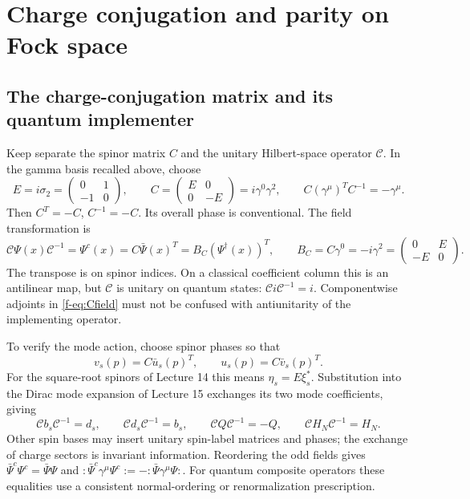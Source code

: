 \documentclass[11pt]{article}
\newcommand{\Dc}{\mathcal C}
\begin{document}
\section{Charge conjugation and parity on Fock space}
\subsection{The charge-conjugation matrix and its quantum implementer}
Keep separate the spinor matrix \(C\) and the unitary Hilbert-space
operator \(\Dc\). In the gamma basis recalled above, choose
\begin{equation}
 E=i\sigma_2=\begin{pmatrix}0&1\\-1&0\end{pmatrix},\qquad
 C=\begin{pmatrix}E&0\\0&-E\end{pmatrix}=i\gamma^0\gamma^2,
 \qquad C(\gamma^\mu)^T C^{-1}=-\gamma^\mu.
 \label{f-eq:Cmatrix}
\end{equation}
Then \(C^T=-C\), \(C^{-1}=-C\). Its overall phase is conventional.
The field transformation is
\begin{equation}
 \Dc\Psi(x)\Dc^{-1}=\Psi^c(x)=C\bar\Psi(x)^T
   =B_C(\Psi^\dagger(x))^T,\qquad B_C=C\gamma^0=-i\gamma^2=\begin{pmatrix}0&E\\-E&0\end{pmatrix}.
 \label{f-eq:Cfield}
\end{equation}
The transpose is on spinor indices. On a classical coefficient column
this is an antilinear map, but \(\Dc\) is unitary on quantum states:
\(\Dc i\Dc^{-1}=i\). Componentwise adjoints in \eqref{f-eq:Cfield} must not
be confused with antiunitarity of the implementing operator.

To verify the mode action, choose spinor phases so that
\begin{equation}
 v_s(p)=C\bar u_s(p)^T,\qquad u_s(p)=C\bar v_s(p)^T.
 \label{f-eq:Cspinors}
\end{equation}
For the square-root spinors of Lecture 14 this means
\(\eta_s=E\xi_s^*\). Substitution into the Dirac mode expansion of Lecture 15 exchanges its two
mode coefficients, giving
\begin{equation}
 \Dc b_s\Dc^{-1}=d_s,\qquad \Dc d_s\Dc^{-1}=b_s,\qquad
 \Dc Q\Dc^{-1}=-Q,\qquad \Dc H_N\Dc^{-1}=H_N.
 \label{f-eq:Cmodes}
\end{equation}
Other spin bases may insert unitary spin-label matrices and phases;
the exchange of charge sectors is invariant information.
Reordering the odd fields gives
\(\bar\Psi^c\Psi^c=\bar\Psi\Psi\) and
\(:\bar\Psi^c\gamma^\mu\Psi^c:=-:\bar\Psi\gamma^\mu\Psi:\).
For quantum composite operators these equalities use a consistent
normal-ordering or renormalization prescription.
\end{document}
